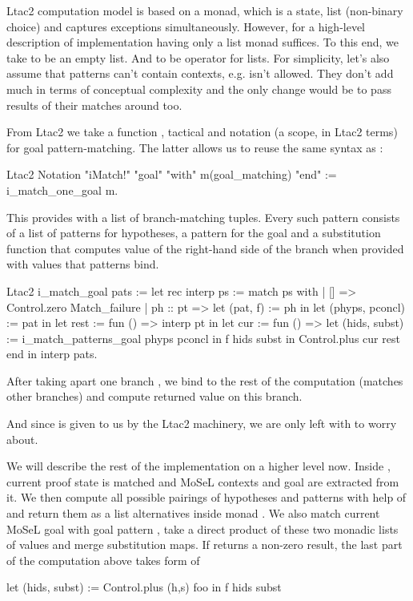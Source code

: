 Ltac2 computation model is based on a monad, which is a state, list (non-binary choice) and captures exceptions simultaneously.
However, for a high-level description of implementation having only a list monad  suffices.
To this end, we take  to be an empty list.
And  to be  operator for lists.
For simplicity, let's also assume that patterns can't contain contexts, e.g.  isn't allowed.
They don't add much in terms of conceptual complexity and the only change would be to pass results of their matches around too.

From Ltac2 we take a function ,  tactical and notation (a scope, in Ltac2 terms) for goal pattern-matching.
The latter allows us to reuse the same syntax as :
\begin{coq}
Ltac2 Notation "iMatch!" "goal" "with" m(goal_matching) "end" :=
  i_match_one_goal m.
\end{coq}
This provides  with a list of branch-matching tuples.
Every such pattern consists of a list of patterns for hypotheses, a pattern for the goal and a substitution function that computes value of the right-hand side of the branch when provided with values that patterns bind.

\begin{coq}
Ltac2 i_match_goal pats :=
  let rec interp ps := match ps with
  | [] => Control.zero Match_failure
  | ph :: pt =>
    let (pat, f) := ph in
    let (phyps, pconcl) := pat in
    let rest := fun () => interp pt in
    let cur := fun () =>
      let (hids, subst) := i_match_patterns_goal phyps pconcl in
      f hids subst
    in Control.plus cur rest
  end in
  interp pats.
\end{coq}

After taking apart one branch , we bind  to the rest of the computation (matches other branches) and compute returned value on this branch.

And since  is given to us by the Ltac2 machinery, we are only left with  to worry about.

We will describe the rest of the implementation on a higher level now.
Inside , current proof state is matched and MoSeL contexts and goal are extracted from it.
We then compute all possible pairings of hypotheses and patterns with help of  and return them as a list alternatives inside monad .
We also match current MoSeL goal with goal pattern , take a direct product of these two monadic lists of values and merge substitution maps.
If  returns a non-zero result, the last part of the computation above takes form of
\begin{coq}
let (hids, subst) := Control.plus (h,s) foo in
f hids subst
\end{coq}

